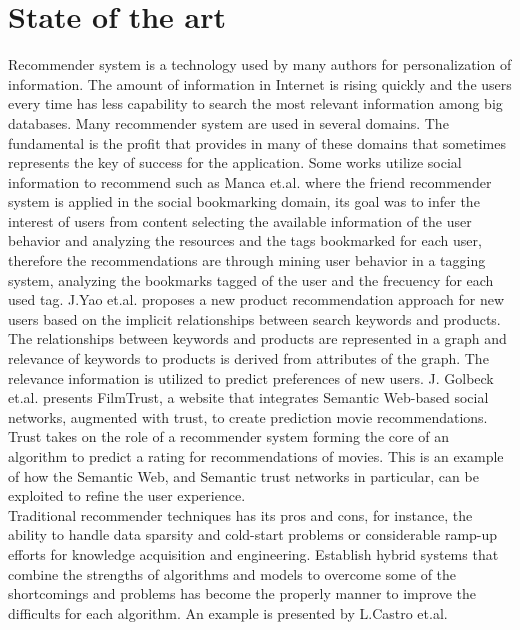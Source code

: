 \chapter{State of the art} \label{stateoftheart}

Recommender system is a technology used by many authors for
personalization of information. The amount of information in Internet
is rising quickly and the users every time has less capability to
search the most relevant information among big databases. Many
recommender  system are used in several domains. 
The fundamental is the profit that provides in many of
these domains that sometimes represents the key of success for the
application.  Some works utilize social information to recommend such
as Manca et.al.\cite{manca2014mining} where the friend recommender
system is applied in the social bookmarking domain, its goal was to
infer the interest of users from content selecting the available
information of the user behavior and analyzing the resources and the
tags bookmarked for each user, therefore the recommendations are
through mining user behavior in a tagging system, analyzing the
bookmarks tagged of the user and the frecuency for each used tag. 
J.Yao et.al.\cite{yao2012product} proposes a new product recommendation
approach for new users based on the implicit relationships between
search keywords and products. The relationships between keywords and
products are represented in a graph and relevance of keywords to
products is derived from attributes of the graph. The relevance
information is utilized to predict preferences of new users. J.
Golbeck et.al.\cite{golbeck2006filmtrust} presents FilmTrust, a
website that integrates Semantic Web-based social networks, augmented
with trust, to create prediction movie recommendations. Trust takes on
the role of a recommender system forming the core of an algorithm to
predict a rating for recommendations of movies. This is an example of
how the Semantic Web, and Semantic trust networks in particular, can
be exploited to refine the user experience. \\  
Traditional recommender techniques has its pros and cons, for
instance, the ability to handle data sparsity and cold-start problems
or considerable ramp-up efforts for knowledge acquisition and
engineering. Establish hybrid systems that combine the strengths of
algorithms and models to overcome some of the shortcomings and
problems has become the properly manner to improve the difficults for
each algorithm.
An example is presented by L.Castro et.al.\cite{castro2012prototype} 
